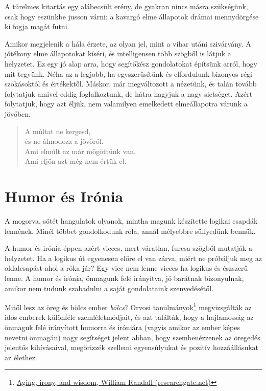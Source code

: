
A türelmes kitartás egy alábecsült erény, de gyakran nincs másra
szükségünk, csak hogy eszünkbe jusson várni: a kavargó elme állapotok
drámai mennydörgése ki fogja magát futni.

Amikor megjelenik a hála érzete, az olyan jel, mint a vihar utáni
szivárvány. A jótékony elme állapotokat kíséri, és intelligensen több
szögből is látjuk a helyzetet. Ez egy jó alap arra, hogy segítőkész
gondolatokat építsünk arról, hogy mit tegyünk. Néha az a legjobb, ha
egyszerűsítünk és elfordulunk bizonyos régi szokásoktól és értékektől.
Máskor, már megváltozott a nézetünk, és talán tovább folytatjuk amivel
eddig foglalkoztunk, de hátra hagyjuk a nagy sietséget. Azért
folytatjuk, hogy azt éljük, nem valamilyen emelkedett elmeállapotra
várunk a jövőben.

\begin{quote}
A múltat ne kergesd,\\
és ne álmodozz a jövőről.\\
Ami elmúlt az már mögöttünk van.\\
Ami eljön azt még nem értük el.

\bigskip

\end{quote}

\clearpage

\section{Humor és Irónia}


\noindent A mogorva, sötét hangulatok olyanok, mintha magunk készítette
logikai csapdák lennének. Minél többet gondolkodunk róla, annál
mélyebbre süllyedünk bennük.

A humor és irónia éppen azért vicces, mert váratlan, furcsa szögből
mutatják a helyzetet. Ha a logikus út egyenesen előre el van zárva,
miért ne próbáljuk meg az oldalcsapást ahol a róka jár? Egy vicc nem
lenne vicces ha logikus és észszerű lenne. A humor és irónia, önmagunk
felé irányítva, jó barátnak bizonyulnak, amikor nem tudunk szabadulni a
saját gondolataink szenvedésétől.

Mitől lesz az öreg és bölcs ember \emph{bölcs}? Orvosi
tanulmányok\footnote{\href{https://www.researchgate.net/publication/258190619_Aging_irony_and_wisdom_On_the_narrative_psychology_of_later_life}{Aging,
  irony, and wisdom, William Randall (researchgate.net)}} megvizsgálták
az idős emberek különféle szemléletmódjait, és azt találták, hogy a
hajlamosság az önmaguk felé irányított humorra és iróniára (vagyis
amikor az ember képes nevetni önmagán) nagy segítséget jelent abban,
hogy szembenézzenek az öregedés jelentős kihívásaival, megőrizzék
szellemi egyensúlyukat és pozitív hozzáállásukat az élethez.

